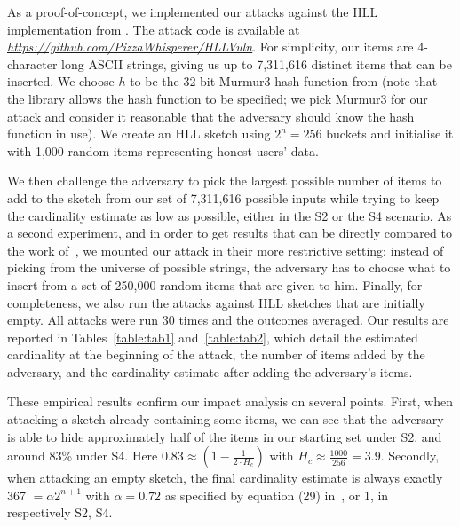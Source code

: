 \documentclass{IEEEtran}
\newcommand{\mathilde}[1]{\todo[inline]{\textbf{Mathilde:} #1}\xspace}
\newcommand{\kenny}[1]{\todo[inline]{\textbf{Kenny:} #1}\xspace}
\begin{document}
As a proof-of-concept, we implemented our attacks against the HLL implementation from \cite{clahll}. The attack code is available at \href{https://github.com/PizzaWhisperer/HLLVuln}{\textit{\url{https://github.com/PizzaWhisperer/HLLVuln}}}. For simplicity, our items are 4-character long ASCII strings, giving us up to 7,311,616 distinct items that can be inserted. We choose $h$ to be the 32-bit Murmur3 hash function from \cite{murmur3code} (note that the library allows the hash function to be specified; we pick Murmur3  for our attack and consider it reasonable that the adversary should know the hash function in use).
We create an HLL sketch using $2^n = 256$ buckets and initialise it with 1,000 random items representing honest users' data.

We then challenge the adversary to pick the largest possible number of items to add to the sketch from our set of  7,311,616 possible inputs while trying to keep the cardinality estimate as low as possible, either in the S2 or the S4 scenario. As a second experiment, and in order to get results that can be directly compared to the work of~\cite{hllvuln}, we mounted our attack in their more restrictive setting: instead of picking from the universe of possible strings, the adversary has to choose what to insert from a set of 250,000 random items that are given to him. Finally, for completeness, we also run the attacks against HLL sketches that are initially empty. All attacks were run 30 times and the outcomes averaged. Our results are reported in Tables~\ref{table:tab1} and~\ref{table:tab2}, which detail the estimated cardinality at the beginning of the attack, the number of items added by the adversary, and the cardinality estimate after adding the adversary's items.

These empirical results confirm our impact analysis on several points. First, when attacking a sketch already containing some items, we can see that the adversary is able to hide approximately half of the items in our starting set under S2, and around 83\% under S4. %
Here $0.83 \approx (1-\frac{1}{2\cdot H_c})$ with $H_c\approx\frac{1000}{256}=3.9$. Secondly, when attacking an empty sketch, the final cardinality estimate is always exactly 367 $=\alpha2^{n+1}$ with $\alpha = 0.72$ as specified by equation (29) in~\cite{hll}, or 1, in respectively S2, S4.
\end{document}
